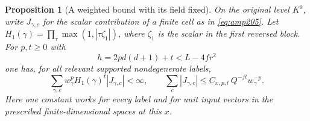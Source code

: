 \documentclass[a4paper,11pt]{article}
\newtheorem{proposition}{Proposition}[section]
\theoremstyle{definition}
\theoremstyle{remark}
\numberwithin{equation}{section}
\begin{document}
\begin{proposition}[A weighted bound with its field fixed]
\label{prop:tail207}
On the original level \(K^0\), write \(J_{\gamma,c}\) for the scalar
contribution of a finite cell as in \eqref{eq:amp205}. Let
\(H_1(\gamma)=\prod_{\tau}\max(1,|\tau\zeta_1|)\), where \(\zeta_1\)
is the scalar in the first reversed block. For \(p,t\ge0\) with
\[
            h=2p d(d+1)+t<L-4fr^2
\]
one has, for all relevant supported nondegenerate labels,
\begin{equation}
 \sum_{\gamma,c} w_\gamma^p H_1(\gamma)^t |J_{\gamma,c}|<\infty,
 \qquad
 \sum_c |J_{\gamma,c}|
       \le C_{x,p,t}\,Q^{-ft} w_\gamma^{-p}.             \label{eq:tail207}
\end{equation}
Here one constant works for every label and for unit input
vectors in the prescribed finite-dimensional spaces at this \(x\).
\end{proposition}
\end{document}
